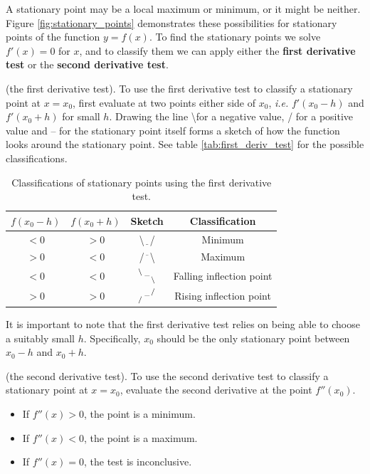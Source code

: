 A stationary point may be a local maximum or minimum, or it might be neither. Figure \ref{fig:stationary_points} demonstrates these possibilities for stationary points of the function $y=f(x)$. To find the stationary points we solve $f'(x) = 0$ for $x$, and to classify them we can apply either the \textbf{first derivative test} or the \textbf{second derivative test}.

\begin{definition}
    (the first derivative test). To use the first derivative test to classify a stationary point at $x=x_0$, first evaluate at two points either side of $x_0$, \emph{i.e.} $f'(x_0-h)$ and $f'(x_0+h)$ for small $h$. Drawing the line \textbackslash for a negative value, / for a positive value and -- for the stationary point itself forms a sketch of how the function looks around the stationary point. See table \ref{tab:first_deriv_test} for the possible classifications.
\end{definition}

\renewcommand{\arraystretch}{2.0}
\begin{table}[h]
    \centering
    \begin{tabular}{|c|c|c|c|}\hline
    $f(x_0-h)$ & $f(x_0+h)$ & Sketch & Classification \\ \hline 
    $<0$  & $>0$ & \textbackslash$\underline{\phantom{x}}$/ & Minimum \\ \hline
    $>0$  & $<0$ & /$\overline{\phantom{x}}$\textbackslash & Maximum \\ \hline
    $<0$  & $<0$ & $\backslash \atop \phantom{x}$--$\phantom{x} \atop \backslash$ & Falling inflection point \\ \hline
    $>0$  & $>0$ & $\phantom{x} \atop /$--$/ \atop \phantom{x}$ & Rising inflection point \\ \hline
    \end{tabular}
    \caption{Classifications of stationary points using the first derivative test.}
    \label{tab:placeholder}
\end{table}

It is important to note that the first derivative test relies on being able to choose a suitably small $h$. Specifically, $x_0$ should be the only stationary point between $x_0-h$ and $x_0 + h$.

\begin{definition}
    (the second derivative test). To use the second derivative test to classify a stationary point at $x=x_0$, evaluate the second derivative at the point $f''(x_0)$.
    \begin{itemize}
        \item If $f''(x) > 0$, the point is a minimum.
        \item If $f''(x) < 0$, the point is a maximum.
        \item If $f''(x) = 0$, the test is inconclusive.
    \end{itemize}
\end{definition}

